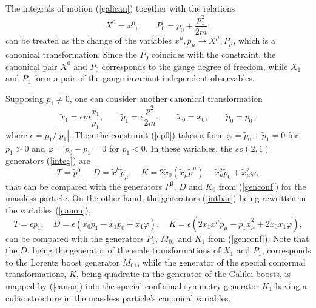 \documentclass[a4paper,12pt]{article}
\begin{document}
The integrals of motion (\ref{galican})
together  with the relations
\begin{equation}
X^0=x^0,\qquad P_0=p_0+\frac{p_1^2}{2m},
\label{x0p0}
\end{equation}
can be treated as the change of the variables
$x^\mu,p_\mu\rightarrow X^\mu, P_\mu$,
which is a canonical transformation.
Since the $P_0$ coincides with the constraint,
the canonical pair $X^0$ and $P_0$ corresponds to the gauge
degree of freedom, while
$X_1$ and $P_1$ form a pair of the gauge-invariant
independent observables.

Supposing $p_1\neq 0$,
one can consider another canonical transformation
\begin{equation}
\tilde x_1=\epsilon m\frac{x_1}{p_1}, \qquad
\tilde p_1=\epsilon \frac{p_1^2}{2m},\qquad
\tilde x_0=x_0,\qquad
\tilde p_0=p_0,
\label{canon}
\end{equation}
where
$\epsilon={p_1}/{|p_1|}$.
Then the constraint (\ref{cp0}) takes a form
$\varphi=\tilde p_0+\tilde p_1=0$ for $\tilde p_1>0$
and $\varphi=\tilde p_0-\tilde p_1=0$ for $\tilde p_1<0$.
In these variables,
the $so(2,1)$ generators
(\ref{integ}) are
\[
T=\tilde p{}^0,\quad
D=\tilde x^\mu \tilde p_\mu,
\quad
K=2\tilde x_0 (\tilde x_\mu \tilde p^\mu)
-\tilde x{}^2_\mu\tilde p_0 +\tilde x{}^2_\mu\varphi,
\]
that can be compared with the
generators
$P^0$,
$D$ and $K_0$ from
(\ref{genconf})
for the massless particle.
On the other hand,
the generators (\ref{intbar})
being rewritten in the variables
(\ref{canon}),
\[
\bar T=\epsilon p_1,\quad
\bar D= \epsilon(\tilde x_0\tilde p_1-\tilde x_1\tilde p_0
+\tilde x_1\varphi),
\quad
\bar K=\epsilon(2\tilde x_1\tilde x{}^\mu\tilde p_\mu
-\tilde p_1\tilde x_\mu^2+2\tilde x_0\tilde x_1\varphi),
\]
can be compared with the generators
$P_1$, $M_{01}$ and $K_1$
from (\ref{genconf}).
Note that the $\bar D$, being the
generator of the scale
transformations of $X_1$ and $P_1$,
corresponds
to the Lorentz boost generator $M_{01}$,
while the generator of the
special conformal transformations,
$\bar K$, being
quadratic in the generator of the Galilei boosts,
is mapped by (\ref{canon})
into the special conformal symmetry generator
$K_1$  having a cubic structure in
the massless particle's canonical variables.
\end{document}
